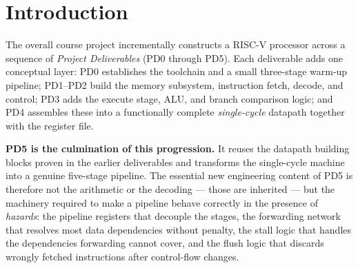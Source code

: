 \documentclass[11pt,a4paper]{article}
\newcommand{\code}[1]{\texttt{#1}}          %
\begin{document}
\begin{abstract}
\noindent
This document describes the design and verification of \textbf{PD5}, the final and
complete deliverable of a multi-stage RISC-V processor project. PD5 implements a
fully-pipelined, five-stage, in-order RISC-V core that supports the RV32I base integer
instruction set, written entirely in SystemVerilog. The core is organised into the
classic \emph{Instruction Fetch}, \emph{Instruction Decode}, \emph{Execute},
\emph{Memory}, and \emph{Writeback} stages, separated by four pipeline registers. To
sustain one-instruction-per-cycle throughput while preserving program correctness, the
design integrates a dedicated hazard unit that performs \emph{data forwarding}
(EX/MEM~$\rightarrow$~EX and MEM/WB~$\rightarrow$~EX bypassing), \emph{stalling} for
load--use and write-to-decode dependencies, and \emph{flushing} of speculatively fetched
instructions following taken branches and jumps. The core was compiled and simulated with
ModelSim (Intel FPGA Starter Edition, part of the Intel Quartus toolchain), driven from a
bash/GNU~Make flow, and debugged through VCD waveform inspection. It was validated against
directed pattern tests, thirteen targeted pipeline micro-tests, and the project
\code{rv32-bmarks} benchmark suite --- comprising thirty-eight RV32UI instruction-level
tests and ten full C-language benchmarks --- \textbf{all of which pass}.
\end{abstract}

\tableofcontents
\newpage

\section{Introduction}
The overall course project incrementally constructs a RISC-V processor across a sequence
of \emph{Project Deliverables} (PD0 through PD5). Each deliverable adds one conceptual
layer: PD0 establishes the toolchain and a small three-stage warm-up pipeline; PD1--PD2
build the memory subsystem, instruction fetch, decode, and control; PD3 adds the execute
stage, ALU, and branch comparison logic; and PD4 assembles these into a functionally
complete \emph{single-cycle} datapath together with the register file.

\textbf{PD5 is the culmination of this progression.} It reuses the datapath building
blocks proven in the earlier deliverables and transforms the single-cycle machine into a
genuine five-stage pipeline. The essential new engineering content of PD5 is therefore not
the arithmetic or the decoding --- those are inherited --- but the machinery required to
make a pipeline behave correctly in the presence of \emph{hazards}: the pipeline registers
that decouple the stages, the forwarding network that resolves most data dependencies
without penalty, the stall logic that handles the dependencies forwarding cannot cover,
and the flush logic that discards wrongly fetched instructions after control-flow changes.
\end{document}
